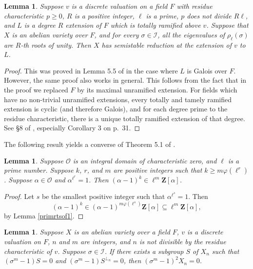 \documentclass{amsart}
\def\Z{{\mathbf Z}}
\def\I{{\mathcal I}}
\def\O{{\mathcal O}}
\newtheorem{lem}[thm]{Lemma}
\theoremstyle{definition}
\begin{document}
\begin{lem}
\label{rootsofone}
Suppose $v$ is a discrete valuation on a field $F$ with residue
characteristic $p \ge 0$, $R$ is a positive integer, $\ell$ is a prime,
$p$ does not divide $R\ell$,
and $L$ is a degree $R$ extension of $F$
which is totally ramified above $v$. 
Suppose that $X$ is an abelian variety over $F$,
and for every $\sigma \in \I$,
all the eigenvalues of $\rho_\ell(\sigma)$ are $R$-th roots of unity.
 Then $X$ has
semistable reduction at the extension of $v$ to $L$.
\end{lem}

\begin{proof}
This was proved in Lemma 5.5 of \cite{semistab} in the case where
$L$ is Galois over $F$. However, the same proof also works in general.
This follows from the fact that in the proof we replaced $F$ by its
maximal unramified extension. For fields which have no non-trivial
unramified extensions, every totally and tamely ramified extension is 
cyclic (and therefore Galois), and for each degree prime to the residue 
characteristic,
there is a unique totally ramified extension of that degree.
See \S8 of \cite{Frohlich}, especially Corollary 3 on p.~31.
\end{proof}

The following result yields a converse of Theorem 5.1 of \cite{serrelem}.

\begin{lem}
\label{algprop}
Suppose $\O$ is an integral domain of characteristic zero, and
$\ell$ is a prime number. Suppose $k$, $r$, and $m$ are positive integers
such that $k \ge m\varphi(\ell^r)$. Suppose $\alpha \in \O$ and
$\alpha^{\ell^r} = 1$. Then 
$(\alpha-1)^{k} \in \ell^m\Z[\alpha]$.
\end{lem}

\begin{proof}
Let $s$ be the smallest positive integer such that $\alpha^{\ell^s} = 1$. 
Then  
$$(\alpha-1)^{k} \in (\alpha-1)^{m\varphi(\ell^s)}\Z[\alpha] 
\subseteq \ell^m\Z[\alpha],$$
by Lemma \ref{primrtsof1}.
\end{proof}

\begin{lem}
\label{ssprelem}
Suppose $X$ is an abelian variety over a field $F$, $v$ is a discrete 
valuation on $F$, $n$ and $m$ are integers, and $n$ is not 
divisible by the residue characteristic of $v$. 
Suppose $\sigma \in \I$.
If there exists a subgroup $S$ of $X_n$
such that $(\sigma^m-1)S = 0$ and $(\sigma^m-1)S^{\perp_n} = 0$,
then 
$(\sigma^m-1)^2 X_n = 0$.
\end{lem}
\end{document}
